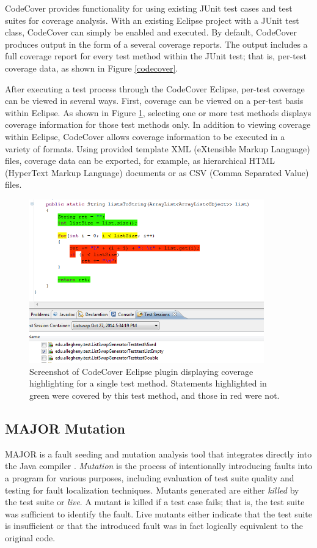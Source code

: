 \documentclass[11pt]{article}
\begin{document}
CodeCover provides functionality for using existing JUnit test cases and
test suites for coverage analysis. With an existing Eclipse project with 
a JUnit test class, CodeCover can simply be enabled and executed.  By 
default, CodeCover produces output in the form of a several coverage
reports.  The output includes a full coverage report for every test method 
within the JUnit test; that is, per-test coverage data, as shown in Figure
\ref{codecover}.  

After executing a test process through the CodeCover Eclipse, per-test
coverage can be viewed in several ways.  First, coverage can be viewed on 
a per-test basis within Eclipse.  As shown in Figure \ref{codecoverage}, 
selecting one or more test methods displays coverage information for those
test methods only.  In addition to viewing coverage within Eclipse, CodeCover
allows coverage information to be executed in a variety of formats.  Using
provided template XML (eXtensible Markup Language) files, coverage data can be exported, for example, as
hierarchical HTML (HyperText Markup Language) documents or as CSV (Comma Separated Value) files.  

\begin{figure}[tpb]
  \centering
  \includegraphics[width=4in]{img/codecovercoverage.png}
  \caption{Screenshot of CodeCover Eclipse plugin displaying coverage
  highlighting for a single test method.  Statements highlighted in green
  were covered by this test method, and those in red were not.}
  \label{codecoverage}
\end{figure}

\subsection{MAJOR Mutation}

MAJOR is a fault seeding and mutation analysis tool that integrates
directly into the Java compiler \cite{major}. \emph{Mutation} is the process of
intentionally introducing faults into a program for various purposes,
including evaluation of test suite quality and testing for fault
localization techniques.  Mutants generated are either \emph{killed} by
the test suite or \emph{live}.  A mutant is killed if a test case fails;
that is, the test suite was sufficient to identify the fault.  Live
mutants either indicate that the test suite is insufficient or that the
introduced fault was in fact logically equivalent to the original code.
\end{document}
